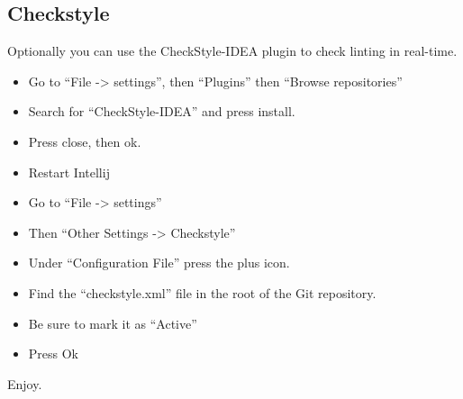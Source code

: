 \subsection*{Checkstyle}
Optionally you can use the CheckStyle-IDEA plugin to check linting in real-time.
\begin{itemize}
    \item Go to ``File -> settings'', then ``Plugins'' then ``Browse repositories''
    \item Search for ``CheckStyle-IDEA'' and press install.
    \item Press close, then ok.
    \item Restart Intellij
    \item Go to ``File -> settings''
    \item Then ``Other Settings -> Checkstyle''
    \item Under ``Configuration File'' press the plus icon.
    \item Find the ``checkstyle.xml'' file in the root of the Git repository.
    \item Be sure to mark it as ``Active''
    \item Press Ok
\end{itemize}

\bigskip
Enjoy.

